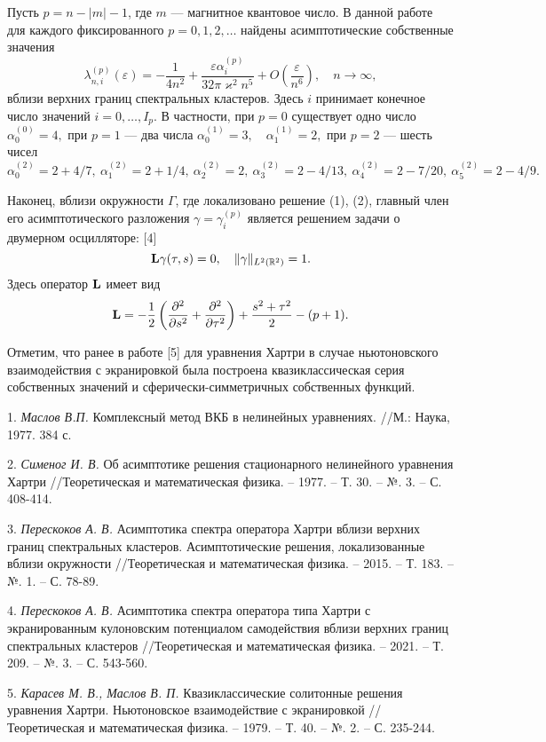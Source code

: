 Пусть $p=n- |m| -1$, где $m$ --- магнитное квантовое число. В данной работе  для каждого фиксированного
$ p=0,1,2,\dots $  найдены асимптотические собственные значения
$$
\lambda _ {n,i}^{(p)} (\varepsilon)= -\frac {1}{4n^2}+\frac{\varepsilon  \alpha_{i}^{(p)} }
{32 \pi \varkappa^2 n^5}+O\left(\frac {\varepsilon }{n^{6}}\right), \quad  n \to \infty ,
$$
вблизи верхних границ спектральных кластеров.
Здесь $i$ принимает конечное число значений  $i=0, \dots, I_{p}$. В частности, при  $p=0$ существует одно число
$
\alpha_{0}^{(0)}=4,
$
при $p=1$ --- два числа
$
\alpha_{0}^{(1)}=3, \quad \alpha_{1}^{(1)}=2,
$
при $p=2$ --- шесть чисел
$
\alpha_{0}^{(2)}=2+4/7, ~ \alpha_{1}^{(2)}=2+1/4, ~ \alpha_{2}^{(2)}=2, ~ \alpha_{3}^{(2)}=2-4/13,
~ \alpha_{4}^{(2)}=2-7/20,~ \alpha_{5}^{(2)}=2-4/9.
$

Наконец,  вблизи окружности $ \Gamma $, где локализовано решение (1), (2),
главный член его асимптотического разложения $ \gamma = \gamma _i^{(p)}$ является
 решением  задачи о двумерном осцилляторе: [4]
$$
{\bf L}\gamma (\tau,s)=0, \quad  \| \gamma \|_{L^2(\mathbb{R}^2)}=1.
$$
Здесь оператор ${\bf L}$ имеет вид
\begin{equation*}
 {\bf L}= -\frac{1}{2}\left(\frac {\partial ^{2}} {\partial s^{2} } + \frac {\partial ^{2}  } {\partial \tau ^{2} }\right)
 +\frac {s^2+\tau^2}{2}-(p+1).
 \label{9}
\end{equation*}

Отметим, что ранее в работе [5] для уравнения Хартри в случае ньютоновского взаимодействия с экранировкой
 была построена квазиклассическая серия собственных значений и сферически-симметричных
собственных функций.


\litlist

1. {\it Маслов В.П.} Комплексный метод ВКБ в нелинейных уравнениях. //М.: Наука, 1977. 384 с.

2. {\it Сименог И. В.} Об асимптотике решения стационарного нелинейного уравнения Хартри //Теоретическая
и математическая физика. – 1977. – Т. 30. – №. 3. – С. 408-414.

3. {\it Перескоков А. В.} Асимптотика спектра оператора Хар\-три вблизи верхних границ
спектральных кластеров. Асимптотические решения, локализованные вблизи окружности //Теоретическая
и математическая физика. – 2015. – Т. 183. – №. 1. – С. 78-89.

4. {\it Перескоков А. В.} Асимптотика спектра оператора типа Хартри с
экранированным кулоновским потенциалом самодействия
вблизи верхних границ спектральных кластеров  //Теоретическая
и математическая физика. – 2021. – Т. 209. – №. 3. – С. 543-560.

5. {\it Карасев М. В., Маслов В. П.} Квазиклассические солитонные решения уравнения Хартри. Ньютоновское
взаимодействие с экранировкой //Теоретическая
и математическая физика. – 1979. – Т. 40. – №. 2. – С. 235-244.

